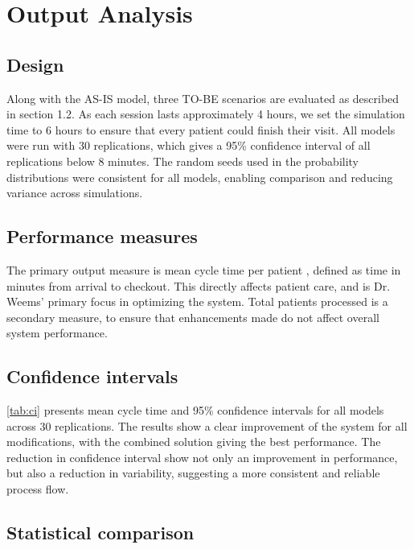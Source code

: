 \section{Output Analysis}

\subsection{Design}

Along with the AS-IS model, three TO-BE scenarios are evaluated as described in section 1.2.
As each session lasts approximately 4 hours, we set the simulation time to 6 hours to ensure that every patient could finish their visit. All models were run with 30 replications, which gives a 95\% confidence interval of all replications below 8 minutes. The random seeds used in the probability distributions were consistent for all models, enabling comparison and reducing variance across simulations.

\subsection{Performance measures}

The primary output measure is mean cycle time per patient \parencite{MillerPainTreatmentCenter}, defined as time in minutes from arrival to checkout. This directly affects patient care, and is Dr. Weems' primary focus in optimizing the system. Total patients processed is a secondary measure, to ensure that enhancements made do not affect overall system performance.

\subsection{Confidence intervals}

\autoref{tab:ci} presents mean cycle time and 95\% confidence intervals for all models across 30 replications. The results show a clear improvement of the system for all modifications, with the combined solution giving the best performance. The reduction in confidence interval show not only an improvement in performance, but also a reduction in variability, suggesting a more consistent and reliable process flow.



\subsection{Statistical comparison}

